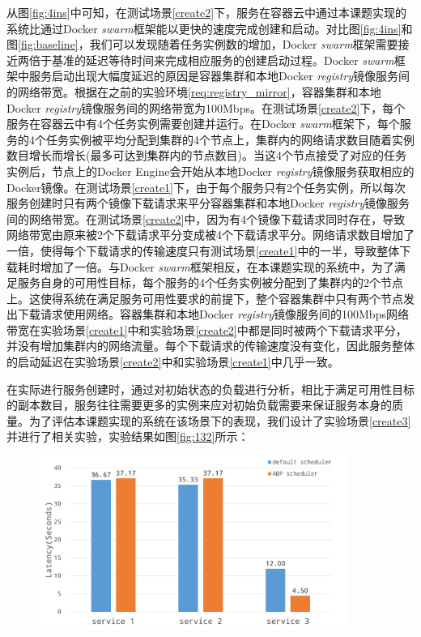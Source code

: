 从图\ref{fig:4ins}中可知，在测试场景\ref{create2}下，服务在容器云中通过本课题实现的系统比通过Docker \emph{swarm}框架能以更快的速度完成创建和启动。对比图\ref{fig:4ins}和图\ref{fig:baseline}，我们可以发现随着任务实例数的增加，Docker \emph{swarm}框架需要接近两倍于基准的延迟等待时间来完成相应服务的创建启动过程。Docker \emph{swarm}框架中服务启动出现大幅度延迟的原因是容器集群和本地Docker \emph{registry}镜像服务间的网络带宽。根据在之前的实验环境\ref{req:registry_mirror}，容器集群和本地Docker \emph{registry}镜像服务间的网络带宽为100Mbps。在测试场景\ref{create2}下，每个服务在容器云中有4个任务实例需要创建并运行。在Docker \emph{swarm}框架下，每个服务的4个任务实例被平均分配到集群的4个节点上，集群内的网络请求数目随着实例数目增长而增长(最多可达到集群内的节点数目)。当这4个节点接受了对应的任务实例后，节点上的Docker Engine会开始从本地Docker \emph{registry}镜像服务获取相应的Docker镜像。在测试场景\ref{create1}下，由于每个服务只有2个任务实例，所以每次服务创建时只有两个镜像下载请求来平分容器集群和本地Docker \emph{registry}镜像服务间的网络带宽。在测试场景\ref{create2}中，因为有4个镜像下载请求同时存在，导致网络带宽由原来被2个下载请求平分变成被4个下载请求平分。网络请求数目增加了一倍，使得每个下载请求的传输速度只有测试场景\ref{create1}中的一半，导致整体下载耗时增加了一倍。与Docker \emph{swarm}框架相反，在本课题实现的系统中，为了满足服务自身的可用性目标，每个服务的4个任务实例被分配到了集群内的2个节点上。这使得系统在满足服务可用性要求的前提下，整个容器集群中只有两个节点发出下载请求使用网络。容器集群和本地Docker \emph{registry}镜像服务间的100Mbps网络带宽在实验场景\ref{create1}中和实验场景\ref{create2}中都是同时被两个下载请求平分，并没有增加集群内的网络流量。每个下载请求的传输速度没有变化，因此服务整体的启动延迟在实验场景\ref{create2}中和实验场景\ref{create1}中几乎一致。

在实际进行服务创建时，通过对初始状态的负载进行分析，相比于满足可用性目标的副本数目，服务往往需要更多的实例来应对初始负载需要来保证服务本身的质量。为了评估本课题实现的系统在该场景下的表现，我们设计了实验场景\ref{create3}并进行了相关实验，实验结果如图\ref{fig:132}所示：
\begin{figure}[H]
\centering
\includegraphics[width=0.9\textwidth]{./figure/132}
\end{figure}

